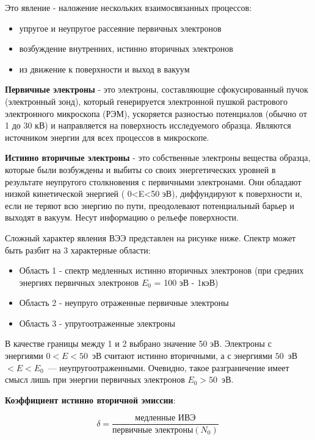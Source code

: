 \documentclass[12pt]{article}
\begin{document}
Это явление - наложение нескольких взаимосвязанных процессов:
\begin{itemize}
  \item упругое и неупругое рассеяние первичных электронов
  \item возбуждение внутренних, истинно вторичных электронов
  \item из движение к поверхности и выход в вакуум
\end{itemize}

\textbf{Первичные электроны} - это электроны, составляющие сфокусированный пучок (электронный зонд), который генерируется электронной пушкой растрового электронного микроскопа (РЭМ), ускоряется разностью потенциалов (обычно от 1 до 30 кВ) и направляется на поверхность исследуемого образца. Являются источником энергии для всех процессов в микроскопе.


\textbf{Истинно вторичные электроны} -  это собственные электроны вещества образца, которые были возбуждены и выбиты со своих энергетических уровней в результате неупругого столкновения с первичными электронами. Они обладают низкой кинетической энергией (
0<E<50 эВ), диффундируют к поверхности и, если не теряют всю энергию по пути, преодолевают потенциальный барьер и выходят в вакуум. Несут информацию о рельефе поверхности.


Сложный характер явления ВЭЭ представлен на рисунке ниже. Спектр может быть разбит на 3 характерные области:

\begin{itemize}
  \item Область 1 - спектр медленных истинно вторичных электронов (при средних энергиях первичных электронов $E_{0}$ = 100 эВ - 1кэВ)
  \item Область 2 - неупруго отраженные первичные электроны
  \item Область 3 - упругоотраженные электроны
\end{itemize}

\newpage

В качестве границы между 1 и 2 выбрано значение 50 эВ. Электроны с энергиями $0 < E < 50$~эВ считают истинно вторичными, а с энергиями $50$~эВ $< E < E_0$~--- неупругоотраженными. Очевидно, такое разграничение имеет смысл лишь при энергии первичных электронов $E_0 > 50$~эВ.

\textbf{Коэффициент истинно вторичной эмиссии}:

\[\delta = \frac{\text{медленные ИВЭ}}{\text{первичные электроны}(N_0)}\ \tag{1}\]
\end{document}
